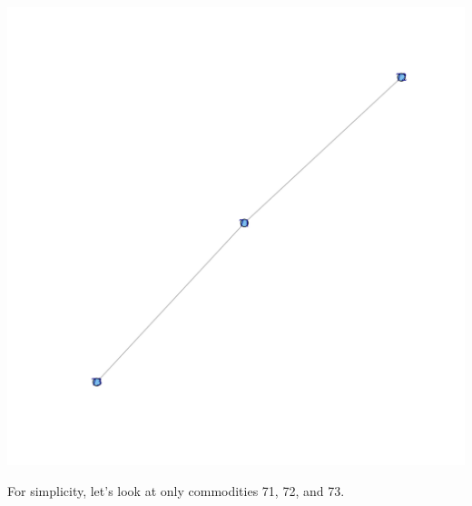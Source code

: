 \documentclass[nojss]{jss}
\begin{document}
\begin{knitrout}
\color{fgcolor}\begin{kframe}
\begin{alltt}
\hlopt{$}
\end{alltt}
\end{kframe}

{\centering \includegraphics[width=\maxwidth]{figure/unnamed-chunk-3-1} 

}



\end{knitrout}

For simplicity, let's look at only commodities 71, 72, and 73.

\begin{knitrout}
\color{fgcolor}\begin{kframe}
\begin{alltt}
 \hlkwb{=} \hlstd{(}   \hlstd{=} \hlstd{(}\hlstd{,} \hlstd{,} \hlstd{),}
                  
\end{alltt}
\end{kframe}
\end{knitrout}
\end{document}
